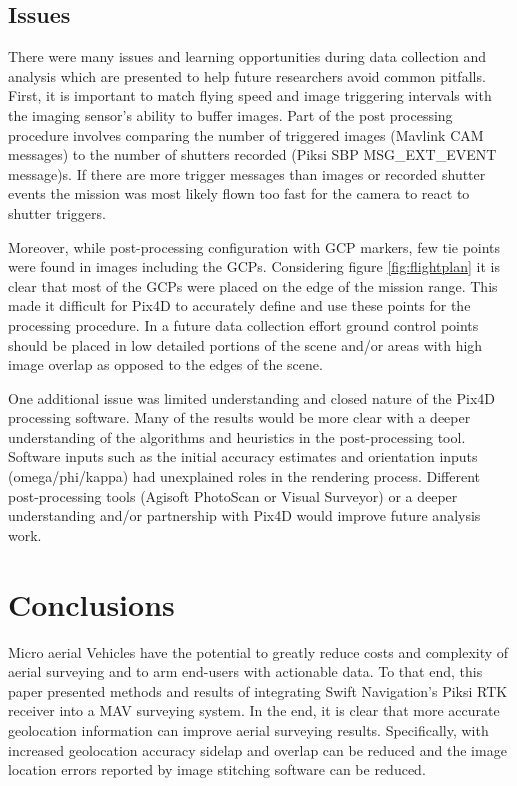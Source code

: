 \documentclass{article}
\begin{document}
\subsection{Issues}
There were many issues and learning opportunities during data collection and analysis which are presented
to help future researchers avoid common pitfalls.  First, it is important to match flying speed and image triggering intervals with the imaging sensor's 
ability to buffer images. Part of the post processing procedure involves comparing the number
of triggered images (Mavlink CAM messages) to the number of shutters recorded (Piksi SBP MSG\_EXT\_EVENT message)s. If there are more trigger messages than images or recorded shutter events the mission was most likely flown too fast for the camera to react to shutter triggers.

Moreover, while post-processing configuration with GCP markers, few tie points were found in images including the
GCPs. Considering figure \ref{fig:flightplan} it is clear that most of the GCPs were placed on the
edge of the mission range. This made it difficult for Pix4D to accurately define and use these
points for the processing procedure.  In a future data collection effort ground control points should be placed in low detailed portions of the scene and/or areas with high image overlap as opposed to the edges of the scene.

One additional issue was limited understanding and closed 
nature of the Pix4D processing software. Many of the results would be more clear with a deeper understanding of the algorithms and heuristics in the post-processing tool. Software inputs such as the initial accuracy estimates
and orientation inputs (omega/phi/kappa) had unexplained roles in the rendering process. Different post-processing tools (Agisoft PhotoScan or Visual 
Surveyor) or a deeper understanding and/or partnership with Pix4D would improve future analysis work.

\section{Conclusions}
Micro aerial Vehicles have the potential to greatly reduce costs and complexity of aerial surveying and to arm end-users with actionable data.  To that end, this paper presented methods and results of integrating Swift Navigation's Piksi RTK receiver into a MAV surveying system.  In the end, it is clear that more accurate geolocation information can improve aerial surveying results.  Specifically, with increased geolocation accuracy sidelap and overlap can be reduced and the image location errors reported by image stitching software can be reduced.
\end{document}
